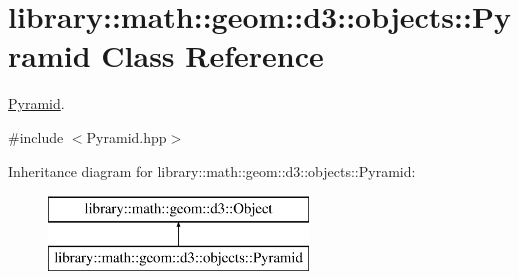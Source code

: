 \hypertarget{classlibrary_1_1math_1_1geom_1_1d3_1_1objects_1_1_pyramid}{}\section{library\+:\+:math\+:\+:geom\+:\+:d3\+:\+:objects\+:\+:Pyramid Class Reference}
\label{classlibrary_1_1math_1_1geom_1_1d3_1_1objects_1_1_pyramid}


\hyperlink{classlibrary_1_1math_1_1geom_1_1d3_1_1objects_1_1_pyramid}{Pyramid}.  




{\ttfamily \#include $<$Pyramid.\+hpp$>$}

Inheritance diagram for library\+:\+:math\+:\+:geom\+:\+:d3\+:\+:objects\+:\+:Pyramid\+:\begin{figure}[H]
\begin{center}
\leavevmode
\includegraphics[height=2.000000cm]{classlibrary_1_1math_1_1geom_1_1d3_1_1objects_1_1_pyramid}
\end{center}
\end{figure}
